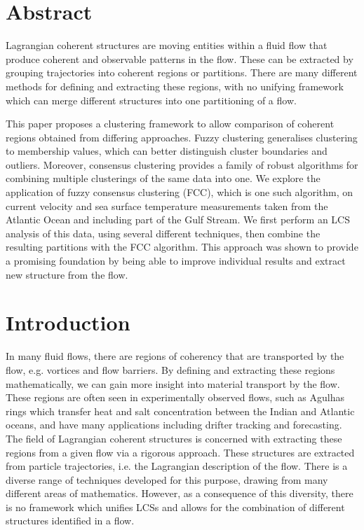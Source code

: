 \documentclass[a4paper, fontsize=12pt]{article}
\begin{document}
\section*{Abstract}
Lagrangian coherent structures are moving entities within a fluid flow that produce coherent and observable patterns in the flow. These can be extracted by grouping trajectories into coherent regions or partitions. There are many different methods for defining and extracting these regions, with no unifying framework which can merge different structures into one partitioning of a flow. 

This paper proposes a clustering framework to allow comparison of coherent regions obtained from differing approaches. Fuzzy clustering generalises clustering to membership values, which can better distinguish cluster boundaries and outliers. Moreover, consensus clustering provides a family of robust algorithms for combining multiple clusterings of the same data into one. We explore the application of fuzzy consensus clustering (FCC), which is one such algorithm, on current velocity and sea surface temperature measurements taken from the Atlantic Ocean and including part of the Gulf Stream. We first perform an LCS analysis of this data, using several different techniques, then combine the resulting partitions with the FCC algorithm. This approach was shown to provide a promising foundation by being able to improve individual results and extract new structure from the flow.




\section{Introduction}
In many fluid flows, there are regions of coherency that are transported by the flow, e.g. vortices and flow barriers. By defining and extracting these regions mathematically, we can gain more insight into material transport by the flow. These regions are often seen in experimentally observed flows, such as Agulhas rings which transfer heat and salt concentration between the Indian and Atlantic oceans, and have many applications including drifter tracking and forecasting. The field of Lagrangian coherent structures is concerned with extracting these regions from a given flow via a rigorous approach. These structures are extracted from particle trajectories, i.e. the Lagrangian description of the flow. There is a diverse range of techniques developed for this purpose, drawing from many different areas of mathematics. However, as a consequence of this diversity, there is no framework which unifies LCSs and allows for the combination of different structures identified in a flow.
\end{document}
